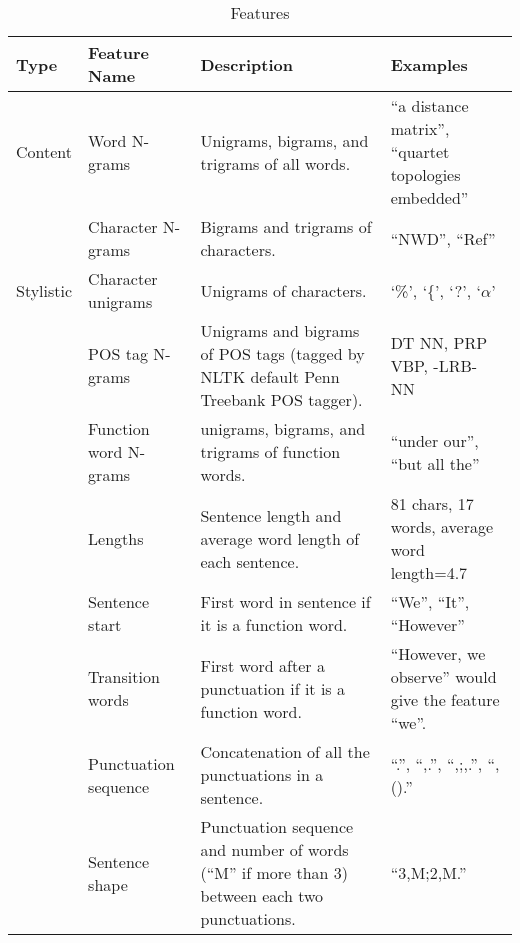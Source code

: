 \begin{table*}[t]
\begin{center}
\small
\bgroup
\def\arraystretch{1.5}
\begin{tabular}{l p{3.5cm} p{5cm} p{4cm}}
 \hline
\textbf{Type} & \textbf{Feature Name} & \textbf{Description} & \textbf{Examples} \\ 
\hline
Content   & Word N-grams       & Unigrams, bigrams, and trigrams of all words.        & ``a distance matrix'', ``quartet topologies embedded''   \\
          & Character N-grams  & Bigrams and trigrams of characters.                  & ``NWD'', ``Ref''                  \\
\hline
Stylistic & Character unigrams & Unigrams of characters.                             & `\%', `\{', `?', `$\alpha$'                           \\
          & POS tag N-grams    & Unigrams and bigrams of POS tags (tagged by NLTK default Penn Treebank POS tagger). &  DT NN, PRP VBP, -LRB- NN \\
          & Function word N-grams & unigrams, bigrams, and trigrams of function words.  & ``under our'', ``but all the''    \\
          & Lengths            & Sentence length and average word length of each sentence. & 81 chars, 17 words, average word length=4.7 \\
          & Sentence start     & First word in sentence if it is a function word.    & ``We'', ``It'', ``However''       \\
          & Transition words   & First word after a punctuation if it is a function word. & ``However, we observe'' would give the feature ``we''.\\
          & Punctuation sequence & Concatenation of all the punctuations in a sentence. & ``.'', ``,.'', ``,;,.'', ``,().'' \\
          & Sentence shape     & Punctuation sequence and number of words (``M'' if more than 3) between each two punctuations. & ``3,M;2,M.'' \\
\hline
\end{tabular}
\egroup
\end{center}
\caption{Features}
\label{table:features}
\end{table*}


